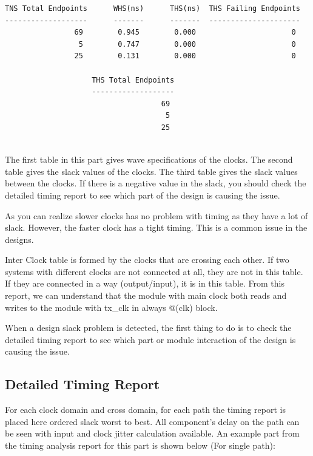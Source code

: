 \documentclass{report}
\begin{document}
\begin{verbatim}
TNS Total Endpoints      WHS(ns)      THS(ns)  THS Failing Endpoints
-------------------      -------      -------  ---------------------
                69        0.945        0.000                      0             
                 5        0.747        0.000                      0                    
                25        0.131        0.000                      0                       

                    THS Total Endpoints
                    -------------------    
                                    69
                                     5
                                    25
    
\end{verbatim}
The first table in this part gives wave specifications of the clocks. The second table gives the slack values of the clocks. The third table gives the slack values between the clocks. If there is a negative value in the slack, you should check the detailed timing report to see which part of the design is causing the issue.

As you can realize slower clocks has no problem with timing as they have a lot of slack. However, the faster clock has a tight timing. This is a common issue in the designs.

Inter Clock table is formed by the clocks that are crossing each other. If two systems with different clocks are not connected at all, they are not in this table. If they are connected in a way (output/input), it is in this table.
From this report, we can understand that the module with main clock both reads and writes to the module with tx\_clk in always @(clk) block.                                                                                                                                                                                                                                                        

When a design slack problem is detected, the first thing to do is to check the detailed timing report to see which part or module interaction of the design is causing the issue.

\subsection{Detailed Timing Report}
For each clock domain and cross domain, for each path the timing report is placed here ordered slack worst to best. All component's delay on the path can be seen with input and clock jitter calculation available.
An example part from the timing analysis report for this part    is shown below (For single path):
\end{document}
